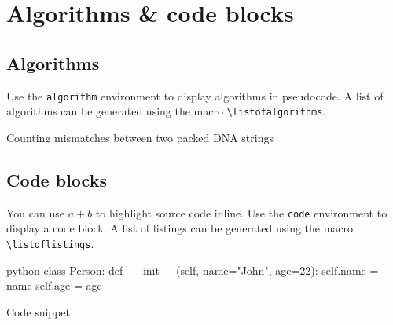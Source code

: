 
\chapter{Algorithms \& code blocks}

\section{Algorithms}

Use the \verb|algorithm| environment to display algorithms in pseudocode. 
A list of algorithms can be generated using the macro \verb|\listofalgorithms|.

\begin{algorithm}
  \caption{Counting mismatches between two packed DNA strings
    \label{alg:packed-dna-hamming}}
  \begin{algorithmic}[0]
         
        \EndIf
      \EndFor
      \State \Return{$\delta$}
    \EndFunction
  \end{algorithmic}
\end{algorithm}

\section{Code blocks}

You can use \texttt{\texttt{$a+b$}} to highlight source code inline. Use the \texttt{code} environment to display a code block. 
A list of listings can be generated using the macro \verb|\listoflistings|.

\begin{listing}[htbp]
\begin{code}{python}
class Person:
    def __init__(self, name="John", age=22):
        self.name = name
        self.age = age
\end{code}
\caption{Code snippet}
\label{code:snippet}
\end{listing}

